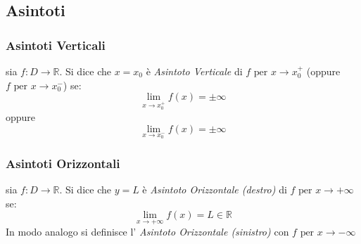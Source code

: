 \documentclass[a4paper,12pt, oneside]{book}
\begin{document}
\subsection{Asintoti}
\subsubsection{Asintoti Verticali}
\begin{definizione}
	sia $f:D \rightarrow \mathbb{R}$. Si dice che $x=x_0$ è \textit{Asintoto Verticale} di $f \mbox{ per } x\rightarrow x_0^{+}$ (oppure $f \mbox{ per } x\rightarrow x_0^{-}$) se:
	$$\lim_{x\rightarrow x_0^{+}} f(x)= \pm \infty $$ oppure $$\lim_{x\rightarrow x_0^{-}} f(x)= \pm \infty $$
\end{definizione}
\subsubsection{Asintoti Orizzontali}
\begin{definizione}
	sia $f:D \rightarrow \mathbb{R}$. Si dice che $y=L$ è \textit{Asintoto Orizzontale (destro)} di $f \mbox{ per } x\rightarrow + \infty$ se:
	$$\lim_{x\rightarrow + \infty} f(x)= L\in \mathbb{R} $$
	In modo analogo si definisce l' \textit{Asintoto Orizzontale (sinistro)} con $f \mbox{ per } x\rightarrow - \infty$
\end{definizione}
\newpage
\end{document}
